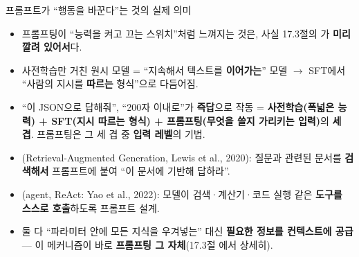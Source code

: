\begin{frame}{프롬프트가 ``행동을 바꾼다''는 것의 실제 의미}
  \begin{itemize}
    \item 프롬프팅이 ``능력을 켜고 끄는 스위치''처럼
      느껴지는 것은, 사실 17.3절의 가
      \textbf{미리 깔려 있어서}다.
    \item 사전학습만 거친 원시 모델 = ``지속해서 텍스트를
      \textbf{이어가는}'' 모델 $\to$ SFT에서 ``사람의
      지시를 \textbf{따르는} 형식''으로 다듬어짐.
    \item ``이 JSON으로 답해줘'', ``200자 이내로''가
      \textbf{즉답}으로 작동 =
      \textbf{사전학습(폭넓은 능력) + SFT(지시 따르는
      형식) + 프롬프팅(무엇을 쓸지 가리키는 입력)}의
      \textbf{세 겹}. 프롬프팅은 그 세 겹 중
      \textbf{입력 레벨}의 기법.
    \item {}(Retrieval-Augmented Generation, Lewis
      et al., 2020): 질문과 관련된 문서를 \textbf{검색해서}
      프롬프트에 붙여 ``이 문서에 기반해 답하라''.
    \item {}(agent, ReAct: Yao et al., 2022):
      모델이 검색·계산기·코드 실행 같은 \textbf{도구를
      스스로 호출}하도록 프롬프트 설계.
    \item 둘 다 ``파라미터 안에 모든 지식을 우겨넣는''
      대신 \textbf{필요한 정보를 컨텍스트에 공급} ---
      이 메커니즘이 바로 \textbf{프롬프팅 그 자체}(17.3절
     에서 상세히).
  \end{itemize}
\end{frame}
